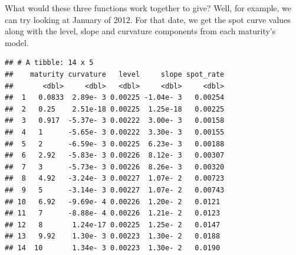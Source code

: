 \documentclass[]{book}
\newenvironment{Shaded}{\begin{snugshade}}{\end{snugshade}}
\newcommand{\ControlFlowTok}[1]{\textcolor[rgb]{0.13,0.29,0.53}{\textbf{#1}}}
\newcommand{\KeywordTok}[1]{\textcolor[rgb]{0.13,0.29,0.53}{\textbf{#1}}}
\newcommand{\NormalTok}[1]{#1}
\newcommand{\OperatorTok}[1]{\textcolor[rgb]{0.81,0.36,0.00}{\textbf{#1}}}
\newcommand{\StringTok}[1]{\textcolor[rgb]{0.31,0.60,0.02}{#1}}
\theoremstyle{definition}
\theoremstyle{definition}
\theoremstyle{definition}
\theoremstyle{remark}
\begin{document}
\begin{Shaded}
\end{Shaded}

What would these three functions work together to give? Well, for
example, we can try looking at January of 2012. For that date, we get
the spot curve values along with the level, slope and curvature
components from each maturity's model.

\begin{Shaded}
\end{Shaded}

\begin{verbatim}
## # A tibble: 14 x 5
##    maturity curvature   level     slope spot_rate
##       <dbl>     <dbl>   <dbl>     <dbl>     <dbl>
##  1   0.0833  2.89e- 3 0.00225 -1.04e- 3   0.00254
##  2   0.25    2.51e-18 0.00225  1.25e-18   0.00225
##  3   0.917  -5.37e- 3 0.00222  3.00e- 3   0.00158
##  4   1      -5.65e- 3 0.00222  3.30e- 3   0.00155
##  5   2      -6.59e- 3 0.00225  6.23e- 3   0.00188
##  6   2.92   -5.83e- 3 0.00226  8.12e- 3   0.00307
##  7   3      -5.73e- 3 0.00226  8.26e- 3   0.00320
##  8   4.92   -3.24e- 3 0.00227  1.07e- 2   0.00723
##  9   5      -3.14e- 3 0.00227  1.07e- 2   0.00743
## 10   6.92   -9.69e- 4 0.00226  1.20e- 2   0.0121 
## 11   7      -8.88e- 4 0.00226  1.21e- 2   0.0123 
## 12   8       1.24e-17 0.00225  1.25e- 2   0.0147 
## 13   9.92    1.30e- 3 0.00223  1.30e- 2   0.0188 
## 14  10       1.34e- 3 0.00223  1.30e- 2   0.0190
\end{verbatim}
\end{document}

